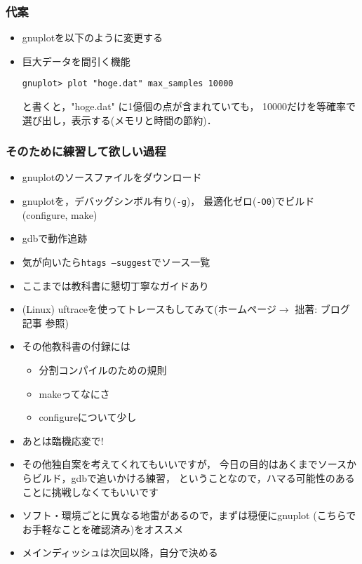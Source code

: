 \documentclass[12pt,dvipdfmx]{beamer}
\begin{document}
\begin{frame}[fragile]
\frametitle{代案}
\begin{itemize}
\item gnuplotを以下のように変更する
\item 巨大データを間引く機能
\begin{lstlisting}
gnuplot> plot "hoge.dat" max_samples 10000
\end{lstlisting}
と書くと，"hoge.dat" に1億個の点が含まれていても，
10000だけを等確率で選び出し，表示する(メモリと時間の節約)．
\end{itemize}
\end{frame}

\begin{frame}
\frametitle{そのために練習して欲しい過程}
\begin{itemize}
\item gnuplotのソースファイルをダウンロード
\item gnuplotを，デバッグシンボル有り({\tt -g})，
  最適化ゼロ({\tt -O0})でビルド(configure, make)
\item gdbで動作追跡
\item 気が向いたら\texttt{htags --suggest}でソース一覧
\item ここまでは教科書に懇切丁寧なガイドあり
\item (Linux) uftraceを使ってトレースもしてみて(ホームページ$\rightarrow$
  拙著: ブログ記事 参照)
\item その他教科書の付録には
  \begin{itemize}
  \item 分割コンパイルのための規則
  \item makeってなにさ
  \item configureについて少し
  \end{itemize}
\item あとは臨機応変で!
\end{itemize}
\end{frame}


\begin{frame}[fragile]
  \begin{itemize}
  \item その他独自案を考えてくれてもいいですが，
    今日の目的はあくまでソースからビルド，gdbで追いかける練習，
    ということなので，ハマる可能性のあることに挑戦しなくてもいいです
  \item ソフト・環境ごとに異なる地雷があるので，まずは穏便にgnuplot
    (こちらでお手軽なことを確認済み)をオススメ
  \item メインディッシュは次回以降，自分で決める
  \end{itemize}
\end{frame}
\end{document}
